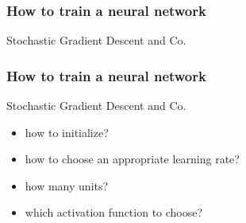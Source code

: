 \documentclass[mathserif, aspectratio=43]{beamer}
\begin{document}
\begin{frame}[fragile]
\frametitle{How to train a neural network}
Stochastic Gradient Descent and Co.

\end{frame}


\begin{frame}[fragile]
\frametitle{How to train a neural network}
Stochastic Gradient Descent and Co.
\begin{itemize}
\item how to initialize?
\item how to choose an appropriate learning rate?
\item how many units?
\item which activation function to choose?
\end{itemize}

\end{frame}
\end{document}
